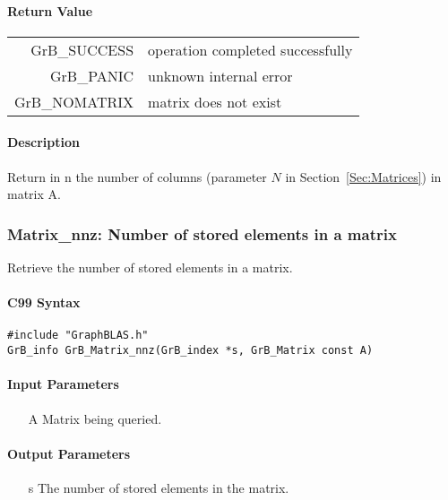 \paragraph{Return Value}

\begin{tabular}{rl}
{\sf GrB\_SUCCESS}	& operation completed successfully \\
{\sf GrB\_PANIC}	& unknown internal error \\
{\sf GrB\_NOMATRIX}	& matrix does not exist \\
\end{tabular}

\paragraph{Description}

Return in {\sf n} the number of columns (parameter $N$ in Section~\ref{Sec:Matrices}) in matrix {\sf A}.


\subsubsection{{\sf Matrix\_nnz}: Number of stored elements in a matrix}

Retrieve the number of stored elements in a matrix.

\paragraph{C99 Syntax}

\begin{verbatim}
#include "GraphBLAS.h"
GrB_info GrB_Matrix_nnz(GrB_index *s, GrB_Matrix const A)
\end{verbatim}

\paragraph{Input Parameters}

\begin{itemize}
	\item[{\sf A}] Matrix being queried.
\end{itemize}

\paragraph{Output Parameters}
\begin{itemize}
	\item[{\sf s}] The number of stored elements in the matrix. 
\end{itemize}

